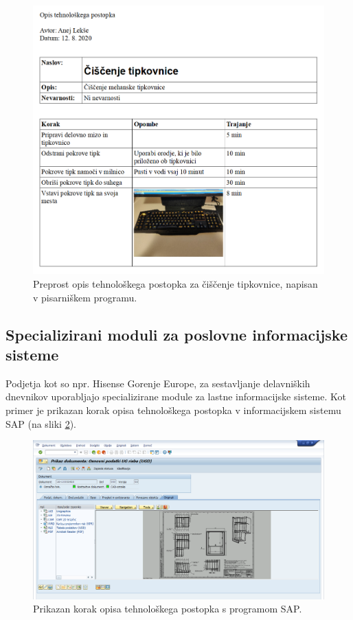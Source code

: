 \documentclass[a4paper, 12pt]{book}
\begin{document}
\begin{figure}[H]
\begin{center}
\includegraphics[width=13cm]{report_writer}
\end{center}
\caption{Preprost opis tehnološkega postopka za čiščenje tipkovnice, napisan v pisarniškem programu.}
\label{report_writer}
\end{figure}

\subsection{Specializirani moduli za poslovne informacijske sisteme}

Podjetja kot so npr. Hisense Gorenje Europe, za sestavljanje delavniških dnevnikov uporabljajo specializirane module za lastne informacijske sisteme.
Kot primer je prikazan korak opisa tehnološkega postopka v informacijskem sistemu SAP (na sliki \ref{sap_1}).

\begin{figure}[H]
\begin{center}
\includegraphics[width=13cm]{sap_1}
\end{center}
\caption{Prikazan korak opisa tehnološkega postopka s programom SAP.}
\label{sap_1}
\end{figure}
\end{document}
